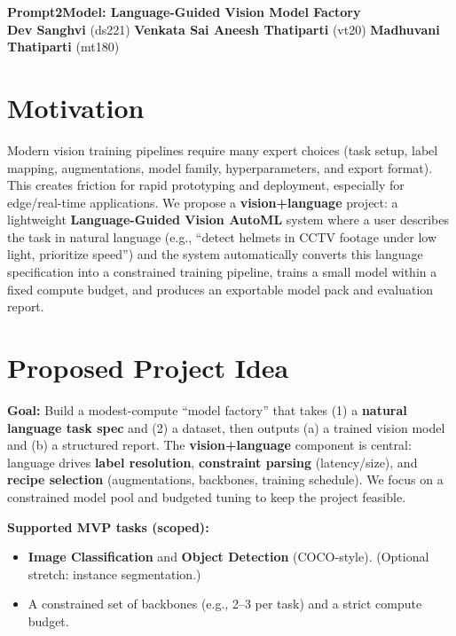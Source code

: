 \documentclass[10pt]{article}
\begin{document}
\begin{center}
{\Large \textbf{Prompt2Model: Language-Guided Vision Model Factory}}\\
\vspace{4pt}
\textbf{Dev Sanghvi} (ds221)\hspace{10pt}
\textbf{Venkata Sai Aneesh Thatiparti} (vt20)\hspace{10pt}
\textbf{Madhuvani Thatiparti} (mt180)\\
\vspace{2pt}
\end{center}

\vspace{-4pt}
\section*{Motivation}
Modern vision training pipelines require many expert choices (task setup, label mapping, augmentations, model family, hyperparameters, and export format). This creates friction for rapid prototyping and deployment, especially for edge/real-time applications. We propose a \textbf{vision+language} project: a lightweight \textbf{Language-Guided Vision AutoML} system where a user describes the task in natural language (e.g., ``detect helmets in CCTV footage under low light, prioritize speed'') and the system automatically converts this language specification into a constrained training pipeline, trains a small model within a fixed compute budget, and produces an exportable model pack and evaluation report.

\section*{Proposed Project Idea}
\textbf{Goal:} Build a modest-compute ``model factory'' that takes (1) a \textbf{natural language task spec} and (2) a dataset, then outputs (a) a trained vision model and (b) a structured report. The \textbf{vision+language} component is central: language drives \textbf{label resolution}, \textbf{constraint parsing} (latency/size), and \textbf{recipe selection} (augmentations, backbones, training schedule). We focus on a constrained model pool and budgeted tuning to keep the project feasible.

\textbf{Supported MVP tasks (scoped):}
\begin{itemize}
  \item \textbf{Image Classification} and \textbf{Object Detection} (COCO-style). (Optional stretch: instance segmentation.)
  \item A constrained set of backbones (e.g., 2--3 per task) and a strict compute budget.
\end{itemize}
\end{document}
